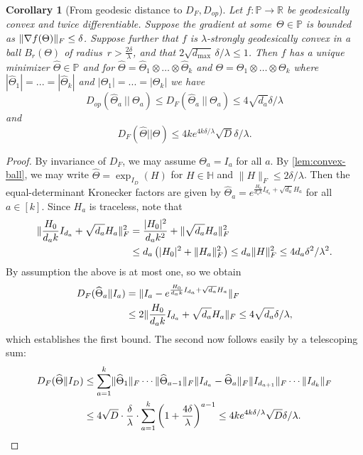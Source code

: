 \documentclass[aos]{imsart}
\newtheorem{corollary}[theorem]{Corollary}
\theoremstyle{definition}
\numberwithin{equation}{section}
\DeclarePairedDelimiter{\abs}{\lvert}{\rvert}
\DeclarePairedDelimiter{\norm}{\lVert}{\rVert}
\newcommand{\R}{{\mathbb{R}}}
\renewcommand{\P}{{\mathbb{P}}}
\renewcommand{\H}{{\mathbb{H}}}
\newcommand{\htheta}{\widehat{\Theta}}
\newcommand{\ot}{\otimes}
\newcommand{\eps}{\varepsilon}
\def\dmax{d_{\max}}
\begin{document}
\begin{corollary}[From geodesic distance to $D_F, D_{op}$] \label{cor:g-convex-components}
Let $f\colon \P \to \R$ be geodesically convex and twice differentiable.
Suppose the gradient at some~$\Theta\in\P$ is bounded as $\norm{\nabla f(\Theta)}_F \leq \delta$. Suppose further that $f$ is $\lambda$-strongly geodesically convex in a ball $B_r(\Theta)$ of radius~$r > \frac{2\delta}\lambda$, and that $2 \sqrt{\dmax} \, \delta/\lambda \leq 1$. Then $f$ has a unique minimizer $\htheta \in \P$ and for $\htheta = \htheta_1 \ot \dots \ot \htheta_k$ and $\Theta = \Theta_1 \ot \dots \ot \Theta_k$ where $|\htheta_1| =... = |\htheta_k|$ and $|\Theta_1| =... = |\Theta_k|$ we have 
$$ D_{op}(\htheta_a \ || \ \Theta_a) \leq D_F(\htheta_a \ || \ \Theta_a) \leq 4 \sqrt{d_a} \delta/\lambda$$
and 
$$ D_F(\htheta|| \Theta) \leq 4 k e^{4k \delta/\lambda} \sqrt{D} \delta /\lambda.$$
\end{corollary}
\begin{proof}
By invariance of $D_F$, we may assume $\Theta_a = I_a$ for all $a$. 
By \cref{lem:convex-ball}, we may write $\htheta = \exp_{I_D}(H) $ for $H \in \H$ and $\|H\|_F \leq 2\delta/\lambda$. 
Then the equal-determinant Kronecker factors are given by $\htheta_a = e^{\frac{H_0}{d_a k} I_{d_a} + \sqrt{d_a} H_a}$ for all~$a\in[k]$. 
Since $H_a$ is traceless, note that 
\begin{align*}
\norm{\frac{H_0}{d_a k} I_{d_a} + \sqrt{d_a} H_a}_F^2
&= \frac{\abs{H_0}^2}{d_a k^2} + \norm{\sqrt{d_a} H_a}_F^2 \\
&\leq d_a \left( \abs{H_0}^2 + \norm{H_a}_F^2 \right)
\leq d_a \norm H_F^2
\leq 4 d_a \delta^2/\lambda^2.
\end{align*}
By assumption the above is at most one, so we obtain
\begin{align*}
  D_F(\htheta_a\Vert I_a)
&= \norm{I_a - e^{\frac{H_0}{d_a k} I_{d_a} + \sqrt{d_a} H_a}}_F\\
&\leq 2 \norm{\frac{H_0}{d_a k} I_{d_a} + \sqrt{d_a} H_a}_F \leq 4 \sqrt{d_a} \delta/\lambda,
\end{align*}
which establishes the first bound.
The second now follows easily by a telescoping sum: 
\begin{align*}
 D_F(\htheta\Vert I_D) 
&\leq \sum_{a=1}^k \norm{\htheta_1}_F \cdots \norm{\htheta_{a-1}}_F \norm{I_{d_a} - \htheta_a}_F \norm{I_{d_{a+1}}}_F \cdots \norm{I_{d_k}}_F \\
&\leq  4\sqrt{D} \cdot \dfrac{\delta}{\lambda} \cdot \sum_{a=1}^k \left(1 +  \dfrac{4\delta}{\lambda}\right)^{a-1} 
\leq  4 k e^{4k \delta/\lambda} \sqrt{D} \delta /\lambda. 
\end{align*}\qedhere

\end{proof}
\end{document}
